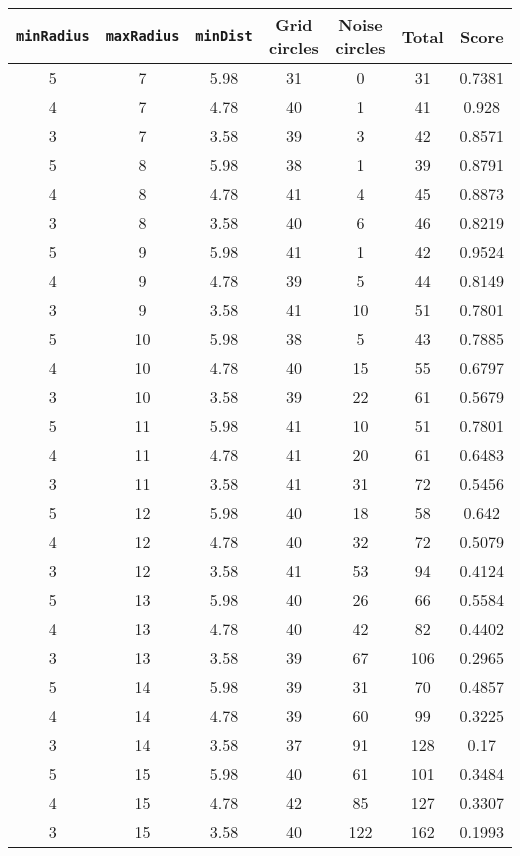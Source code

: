 \documentclass[letterpaper, 12pt]{article}
\begin{document}
\begin{longtable}{|c|c|c|c|c|c|c|}
\hline
\textbf{\texttt{minRadius}} & \textbf{\texttt{maxRadius}} & \textbf{\texttt{minDist}} & \textbf{Grid circles} & \textbf{Noise circles} & \textbf{Total} & \textbf{Score} \\
\hline
5 & 7 & 5.98 & 31 & 0 & 31 & 0.7381 \\
\hline
4 & 7 & 4.78 & 40 & 1 & 41 & 0.928 \\
\hline
3 & 7 & 3.58 & 39 & 3 & 42 & 0.8571 \\
\hline
5 & 8 & 5.98 & 38 & 1 & 39 & 0.8791 \\
\hline
4 & 8 & 4.78 & 41 & 4 & 45 & 0.8873 \\
\hline
3 & 8 & 3.58 & 40 & 6 & 46 & 0.8219 \\
\hline
5 & 9 & 5.98 & 41 & 1 & 42 & 0.9524 \\
\hline
4 & 9 & 4.78 & 39 & 5 & 44 & 0.8149 \\
\hline
3 & 9 & 3.58 & 41 & 10 & 51 & 0.7801 \\
\hline
5 & 10 & 5.98 & 38 & 5 & 43 & 0.7885 \\
\hline
4 & 10 & 4.78 & 40 & 15 & 55 & 0.6797 \\
\hline
3 & 10 & 3.58 & 39 & 22 & 61 & 0.5679 \\
\hline
5 & 11 & 5.98 & 41 & 10 & 51 & 0.7801 \\
\hline
4 & 11 & 4.78 & 41 & 20 & 61 & 0.6483 \\
\hline
3 & 11 & 3.58 & 41 & 31 & 72 & 0.5456 \\
\hline
5 & 12 & 5.98 & 40 & 18 & 58 & 0.642 \\
\hline
4 & 12 & 4.78 & 40 & 32 & 72 & 0.5079 \\
\hline
3 & 12 & 3.58 & 41 & 53 & 94 & 0.4124 \\
\hline
5 & 13 & 5.98 & 40 & 26 & 66 & 0.5584 \\
\hline
4 & 13 & 4.78 & 40 & 42 & 82 & 0.4402 \\
\hline
3 & 13 & 3.58 & 39 & 67 & 106 & 0.2965 \\
\hline
5 & 14 & 5.98 & 39 & 31 & 70 & 0.4857 \\
\hline
4 & 14 & 4.78 & 39 & 60 & 99 & 0.3225 \\
\hline
3 & 14 & 3.58 & 37 & 91 & 128 & 0.17 \\
\hline
5 & 15 & 5.98 & 40 & 61 & 101 & 0.3484 \\
\hline
4 & 15 & 4.78 & 42 & 85 & 127 & 0.3307 \\
\hline
3 & 15 & 3.58 & 40 & 122 & 162 & 0.1993 \\

\end{longtable}
\end{document}
